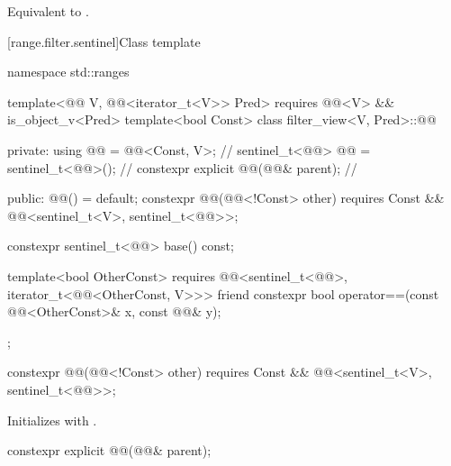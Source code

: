 \begin{itemdescr}
\pnum
\effects
Equivalent to .
\end{itemdescr}

[range.filter.sentinel]{Class template }

%
%
\begin{codeblock}
namespace std::ranges {
  template<@@ V, @@<iterator_t<V>> Pred>
    requires @@<V> && is_object_v<Pred>
  template<bool Const>
  class filter_view<V, Pred>::@@ {
  private:
    using @@ = @@<Const, V>;                         // \expos
    sentinel_t<@@> @@ = sentinel_t<@@>();                 // \expos
    constexpr explicit @@(@@& parent);                // \expos

  public:
    @@() = default;
    constexpr @@(@@<!Const> other)
      requires Const && @@<sentinel_t<V>, sentinel_t<@@>>;

    constexpr sentinel_t<@@> base() const;

    template<bool OtherConst>
      requires @@<sentinel_t<@@>, iterator_t<@@<OtherConst, V>>>
      friend constexpr bool operator==(const @@<OtherConst>& x, const @@& y);
  };
}
\end{codeblock}

%
\begin{itemdecl}
constexpr @@(@@<!Const> other)
  requires Const && @@<sentinel_t<V>, sentinel_t<@@>>;
\end{itemdecl}

\begin{itemdescr}
\pnum
\effects
Initializes  with .
\end{itemdescr}

%
\begin{itemdecl}
constexpr explicit @@(@@& parent);
\end{itemdecl}


